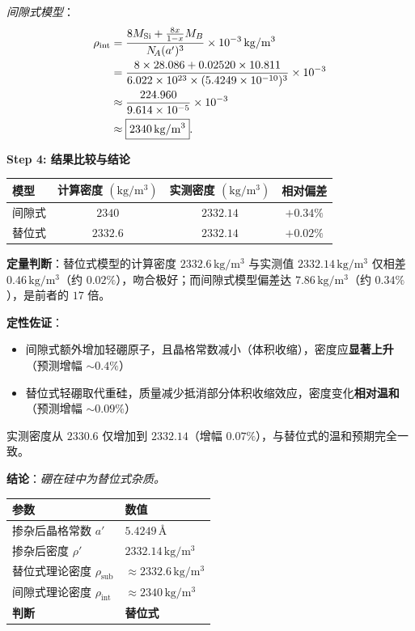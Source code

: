 \begin{derivationbox}[标准解题过程]
\textit{间隙式模型}：
\begin{align}
\rho_{\mathrm{int}}
&= \frac{8M_{\mathrm{Si}} + \frac{8x}{1-x}M_B}{N_{\!A}(a')^{3}}\times 10^{-3}\,\mathrm{kg/m^{3}} \notag\\
&= \frac{8\times 28.086 + 0.02520\times 10.811}{6.022\times 10^{23}\times(5.4249\times 10^{-10})^{3}}\times 10^{-3} \notag\\
&\approx \frac{224.960}{9.614\times 10^{-5}}\times 10^{-3} \notag\\
&\approx \boxed{2340\,\mathrm{kg/m^{3}}}.
\label{eq:int-density}
\end{align}

\textbf{Step 4: 结果比较与结论}

\begin{center}
\begin{tabular}{lccc}
\toprule
\textbf{模型} & \textbf{计算密度} $(\mathrm{kg/m^{3}})$ & \textbf{实测密度} $(\mathrm{kg/m^{3}})$ & \textbf{相对偏差} \\
\midrule
间隙式 & $2340$ & $2332.14$ & $+0.34\%$ \\
替位式 & $2332.6$ & $2332.14$ & $+0.02\%$ \\
\bottomrule
\end{tabular}
\end{center}

\textbf{定量判断}：替位式模型的计算密度 $2332.6\,\mathrm{kg/m^{3}}$ 与实测值 $2332.14\,\mathrm{kg/m^{3}}$ 仅相差 $0.46\,\mathrm{kg/m^{3}}$（约 $0.02\%$），吻合极好；而间隙式模型偏差达 $7.86\,\mathrm{kg/m^{3}}$（约 $0.34\%$），是前者的 $17$ 倍。

\textbf{定性佐证}：
\begin{itemize}
    \item 间隙式额外增加轻硼原子，且晶格常数减小（体积收缩），密度应\textbf{显著上升}（预测增幅 $\sim 0.4\%$）
    \item 替位式轻硼取代重硅，质量减少抵消部分体积收缩效应，密度变化\textbf{相对温和}（预测增幅 $\sim 0.09\%$）
\end{itemize}
实测密度从 $2330.6$ 仅增加到 $2332.14$（增幅 $0.07\%$），与替位式的温和预期完全一致。

\textbf{结论}：\textit{硼在硅中为替位式杂质。}
\end{derivationbox}

\begin{formulabox}[核心公式与数值]
\begin{center}
\begin{tabular}{ll}
\toprule
\textbf{参数} & \textbf{数值} \\
\midrule
掺杂后晶格常数 $a'$ & $5.4249\,\text{\AA}$ \\
掺杂后密度 $\rho'$ & $2332.14\,\mathrm{kg/m^{3}}$ \\
替位式理论密度 $\rho_{\mathrm{sub}}$ & $\approx 2332.6\,\mathrm{kg/m^{3}}$ \\
间隙式理论密度 $\rho_{\mathrm{int}}$ & $\approx 2340\,\mathrm{kg/m^{3}}$ \\
\midrule
\textbf{判断} & \textbf{替位式} \\
\bottomrule
\end{tabular}
\end{center}
\end{formulabox}

